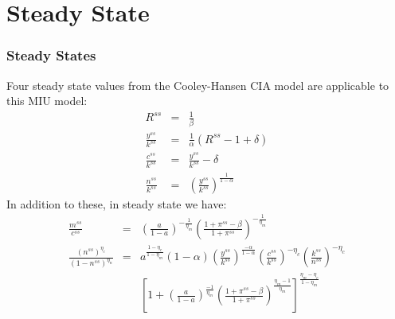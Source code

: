 \documentclass[handout]{beamer}
\begin{document}
\section{Steady State}

\begin{frame}
\frametitle{Steady States}\vskip0.1in

{\scriptsize{Four steady state values from the Cooley-Hansen CIA model are
applicable to this MIU model:
\begin{eqnarray}
R^{ss} &=& \frac{1}{\beta} \label{Eq5.28}\\
\frac{y^{ss}}{k^{ss}} &=& \frac{1}{\alpha}(R^{ss}
-1+\delta)\label{Eq5.29}\\
\frac{c^{ss}}{k^{ss}} &=& \frac{y^{ss}}{k^{ss}}-\delta
\label{Eq5.30}\\
\frac{n^{ss}}{k^{ss}} &=&
(\frac{y^{ss}}{k^{ss}})^{\frac{1}{1-\alpha}} \label{Eq5.31}
\end{eqnarray}
}}
{\scriptsize{In addition to these, in steady state we have:
\begin{eqnarray}
\frac{m^{ss}}{c^{ss}} &=& (\frac{a}{1-a})^{-\frac{1}{\eta_{m}}} (\frac{1+\pi^{ss}-\beta}{1+\pi^{ss}})^{-\frac{1}{\eta_{m}}}  \label{Eq5.32}\\
\frac{(n^{ss})^{\eta_{c}}}{(1-n^{ss})^{\eta_{n}}} &=&
a^{\frac{1-\eta_{c}}{1-\eta_{m}}}
(1-\alpha)(\frac{y^{ss}}{k^{ss}})^{\frac{-\alpha}{1-\alpha}}
(\frac{c^{ss}}{k^{ss}})^{-\eta_{c}}
(\frac{k^{ss}}{n^{ss}})^{-\eta_{c}} \nonumber\\&& [1+
(\frac{a}{1-a})^{\frac{-1}{\eta_{m}}}
(\frac{1+\pi^{ss}-\beta}{1+\pi^{ss}})^{\frac{\eta_{m}-1}{\eta_{m}}}]
^{\frac{\eta_{m}-\eta_{c}}{1-\eta_{m}}}\label{Eq5.33}
\end{eqnarray}
}}

\end{frame}
\end{document}
